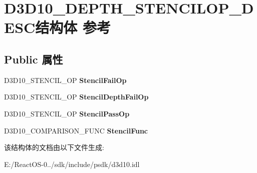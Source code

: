 \hypertarget{struct_d3_d10___d_e_p_t_h___s_t_e_n_c_i_l_o_p___d_e_s_c}{}\section{D3\+D10\+\_\+\+D\+E\+P\+T\+H\+\_\+\+S\+T\+E\+N\+C\+I\+L\+O\+P\+\_\+\+D\+E\+S\+C结构体 参考}
\label{struct_d3_d10___d_e_p_t_h___s_t_e_n_c_i_l_o_p___d_e_s_c}
\subsection*{Public 属性}
\begin{DoxyCompactItemize}
\item 
\mbox{\label{struct_d3_d10___d_e_p_t_h___s_t_e_n_c_i_l_o_p___d_e_s_c_a625d8111e6a694167d2e82dab46d6a67}} 
D3\+D10\+\_\+\+S\+T\+E\+N\+C\+I\+L\+\_\+\+OP {\bfseries Stencil\+Fail\+Op}
\item 
\mbox{\label{struct_d3_d10___d_e_p_t_h___s_t_e_n_c_i_l_o_p___d_e_s_c_a3130dfc7f4d806da82de616279c79476}} 
D3\+D10\+\_\+\+S\+T\+E\+N\+C\+I\+L\+\_\+\+OP {\bfseries Stencil\+Depth\+Fail\+Op}
\item 
\mbox{\label{struct_d3_d10___d_e_p_t_h___s_t_e_n_c_i_l_o_p___d_e_s_c_a0b0dfc7106715caf954b2d1fd313f76a}} 
D3\+D10\+\_\+\+S\+T\+E\+N\+C\+I\+L\+\_\+\+OP {\bfseries Stencil\+Pass\+Op}
\item 
\mbox{\label{struct_d3_d10___d_e_p_t_h___s_t_e_n_c_i_l_o_p___d_e_s_c_a3121e97b809b8f21804445e8d1fa456b}} 
D3\+D10\+\_\+\+C\+O\+M\+P\+A\+R\+I\+S\+O\+N\+\_\+\+F\+U\+NC {\bfseries Stencil\+Func}
\end{DoxyCompactItemize}


该结构体的文档由以下文件生成\+:\begin{DoxyCompactItemize}
\item 
E\+:/\+React\+O\+S-\/0../sdk/include/psdk/d3d10.\+idl\end{DoxyCompactItemize}
